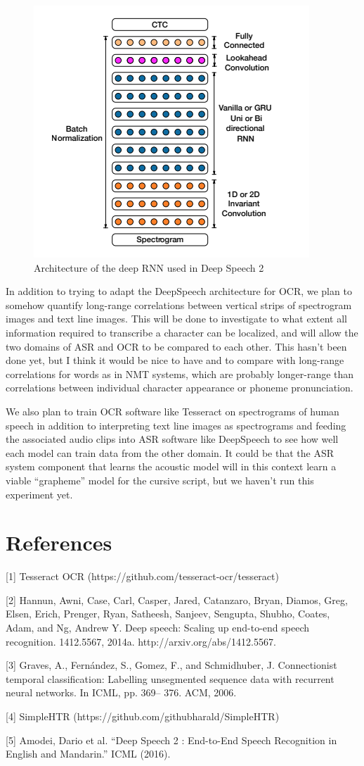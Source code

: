 \documentclass{article}
\begin{document}
\begin{figure}
  \centering
\includegraphics[width=.5\textwidth]{deepspeech2.png}
\caption{Architecture of the deep RNN used in Deep Speech 2}
\end{figure}

In addition to trying to adapt the DeepSpeech architecture for OCR, we plan to
somehow quantify long-range correlations between vertical strips of spectrogram
images and text line images. This will be done to investigate to what extent all
information required to transcribe a character can be localized, and will allow
the two domains of ASR and OCR to be compared to each other. This hasn't been
done yet, but I think it would be nice to have and to compare with long-range
correlations for words as in NMT systems, which are probably longer-range than
correlations between individual character appearance or phoneme pronunciation.


We also plan to train OCR software like Tesseract on spectrograms of human
speech in addition to interpreting text line images as spectrograms and feeding
the associated audio clips into ASR software like DeepSpeech to see how well
each model can train data from the other domain. It could be that the ASR system
component that learns the acoustic model will in this context learn a viable
``grapheme'' model for the cursive script, but we haven't run this experiment
yet.
\section*{References}

\small

[1] Tesseract OCR (https://github.com/tesseract-ocr/tesseract)

[2] Hannun, Awni, Case, Carl, Casper, Jared, Catanzaro, Bryan, Diamos, Greg, Elsen, Erich, Prenger, Ryan, Satheesh, Sanjeev,
Sengupta, Shubho, Coates, Adam, and Ng, Andrew Y. Deep
speech: Scaling up end-to-end speech recognition. 1412.5567,
2014a. http://arxiv.org/abs/1412.5567.

[3] Graves, A., Fernández, S., Gomez, F., and Schmidhuber, J. Connectionist temporal
classification: Labelling unsegmented sequence data with recurrent neural
networks. In ICML, pp. 369– 376. ACM, 2006.

[4] SimpleHTR (https://github.com/githubharald/SimpleHTR)

[5]  Amodei, Dario et al. “Deep Speech 2 : End-to-End Speech Recognition in English and Mandarin.” ICML (2016).
\end{document}
